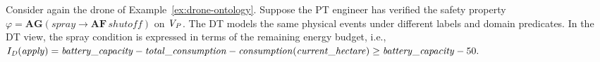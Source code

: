 %

\begin{example}
Consider again the drone of Example~\ref{ex:drone-ontology}. Suppose the PT engineer has verified the safety property
$\varphi = \mathbf{AG}(\mathit{spray} \rightarrow \mathbf{AF}\,\mathit{shutoff})$
on $\mathit{V_P}$. The DT models the same physical events under different
labels and domain predicates. In the DT view, the spray condition is
expressed in terms of the remaining energy budget, i.e., $ I_{\mathit{D}}(\mathit{apply}) =
    \mathit{battery\_capacity} -
    \mathit{total\_consumption} - \mathit{consumption}(\mathit{current\_hectare}) \geq
    \mathit{battery\_capacity} - 50.$


\end{example}
